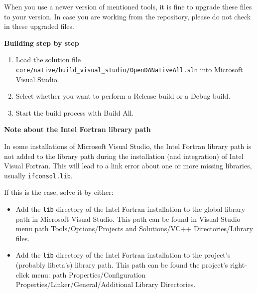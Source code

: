 When you use a newer version of mentioned tools, it is fine to upgrade these files to your version. In case you are working from the repository, please do not check in these upgraded files. 

\textbf{Building step by step}

\begin{enumerate}
	\item Load the solution file \verb|core/native/build_visual_studio/OpenDANativeAll.sln| into Microsoft Visual Studio.
	\item Select whether you want to perform a Release build or a Debug build.
	\item Start the build process with Build All.
\end{enumerate}

\textbf{Note about the Intel Fortran library path}

In some installations of Microsoft Visual Studio, the Intel Fortran library path is not added to the library path during the installation (and integration) of Intel Visual Fortran. This will lead to a link error about one or more missing libraries, usually \verb|ifconsol.lib|.

If this is the case, solve it by either:

\begin{itemize}
	\item Add the \verb|lib| directory of the Intel Fortran installation to the global library path in Microsoft Visual Studio. This path can be found in Visual Studio menu path Tools/Options/Projects and Solutions/VC++ Directories/Library files.
	\item Add the \verb|lib| directory of the Intel Fortran installation to the project's (probably libcta's) library path. This path can be found the project's right-click menu: path Properties/Configuration Properties/Linker/General/Additional Library Directories.
\end{itemize}
    
    
